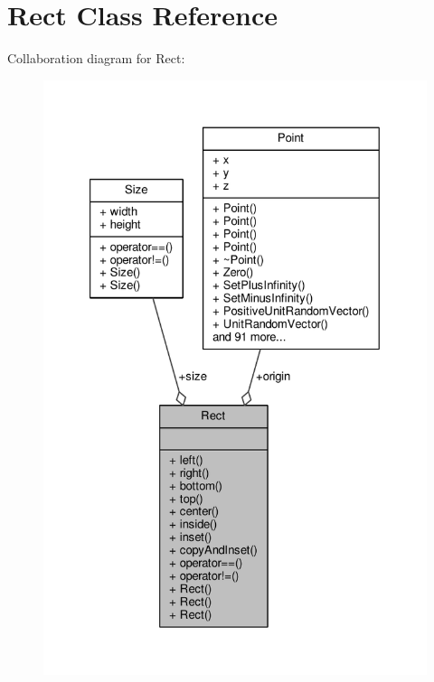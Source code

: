 \hypertarget{classRect}{}\section{Rect Class Reference}
\label{classRect}


Collaboration diagram for Rect\+:
\nopagebreak
\begin{figure}[H]
\begin{center}
\leavevmode
\includegraphics[width=327pt]{dc/df5/classRect__coll__graph}
\end{center}
\end{figure}
